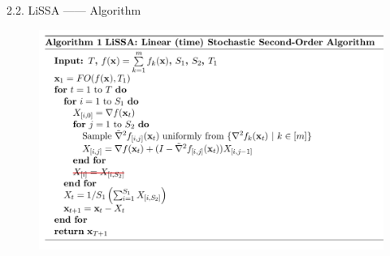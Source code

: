 \documentclass[pdf]{beamer}
\theoremstyle{remark}
\theoremstyle{definition}
\begin{document}
\begin{frame}{2.2. LiSSA —— Algorithm}
\begin{figure}
	\includegraphics[scale=0.45]{fig/alg1.png}
\end{figure}
\end{frame}
\end{document}
